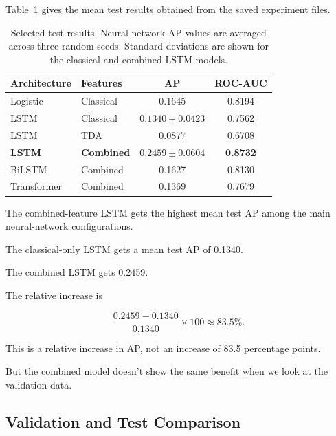 \documentclass[oneside,english,11pt]{article}
\begin{document}
Table~\ref{tab:main_results} gives the
mean test results obtained from the
saved experiment files.

\begin{table}[htbp]
\centering
\small

\caption{
Selected test results.
Neural-network AP values are averaged
across three random seeds.
Standard deviations are shown for
the classical and combined LSTM models.
}
\label{tab:main_results}

\begin{tabular}{llcc}
\toprule
Architecture & Features & AP & ROC-AUC\\
\midrule

Logistic & Classical & 0.1645 & 0.8194\\

LSTM & Classical &
$0.1340\pm0.0423$ & 0.7562\\

LSTM & TDA & 0.0877 & 0.6708\\

\textbf{LSTM} &
\textbf{Combined} &
$\mathbf{0.2459\pm0.0604}$ &
\textbf{0.8732}\\

BiLSTM & Combined & 0.1627 & 0.8130\\

Transformer & Combined & 0.1369 & 0.7679\\

\bottomrule
\end{tabular}

\end{table}

The combined-feature LSTM gets
the highest mean test AP among
the main neural-network configurations.

The classical-only LSTM gets
a mean test AP of 0.1340.

The combined LSTM gets 0.2459.

The relative increase is

\begin{equation}
\frac{
0.2459-0.1340
}{
0.1340
}
\times100
\approx83.5\%.
\end{equation}

This is a relative increase in AP,
not an increase of 83.5 percentage points.

But the combined model doesn’t show the 
same benefit when we look at the validation data.

\subsection{Validation and Test Comparison}
\end{document}
